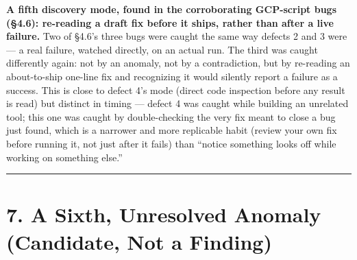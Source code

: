 \textbf{A fifth discovery mode, found in the corroborating GCP-script
bugs (§4.6): re-reading a draft fix before it ships, rather than after a
live failure.} Two of §4.6's three bugs were caught the same way defects
2 and 3 were --- a real failure, watched directly, on an actual run. The
third was caught differently again: not by an anomaly, not by a
contradiction, but by re-reading an about-to-ship one-line fix and
recognizing it would silently report a failure as a success. This is
close to defect 4's mode (direct code inspection before any result is
read) but distinct in timing --- defect 4 was caught while building an
unrelated tool; this one was caught by double-checking the very fix
meant to close a bug just found, which is a narrower and more replicable
habit (review your own fix before running it, not just after it fails)
than ``notice something looks off while working on something else.''

\begin{center}\rule{0.5\linewidth}{0.5pt}\end{center}

\hypertarget{a-sixth-unresolved-anomaly-candidate-not-a-finding}{%
\section{7. A Sixth, Unresolved Anomaly (Candidate, Not a
Finding)}\label{a-sixth-unresolved-anomaly-candidate-not-a-finding}}

